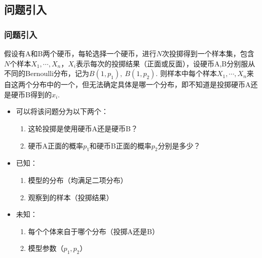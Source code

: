 \documentclass[UTF8]{ctexbeamer}
\numberwithin{equation}{section}  %
\begin{document}
\subsection{问题引入}
\begin{frame}
    \frametitle{问题引入}

    假设有A和B两个硬币，每轮选择一个硬币，进行$N$次投掷得到一个样本集，包含$N$个样本$X_1,\cdots, X_n$，$X_i$表示每次的投掷结果（正面或反面），设硬币A,B分别服从不同的Bernoulli分布，记为$B(1,p_1),\ B(1,p_2)$. 则样本中每个样本$X_1,\cdots,X_n$来自这两个分布中的一个，但无法确定具体是哪一个分布，即不知道是投掷硬币A还是硬币B得到的$x_i$. 
    \begin{itemize}
        \item<2-> 可以将该问题分为以下两个：

        \begin{enumerate}
            \item 这轮投掷是使用硬币A还是硬币B？
            \item 硬币A正面的概率$p_1$和硬币B正面的概率$p_2$分别是多少？
        \end{enumerate}
        \item<3->已知：
        \begin{enumerate}
            \item 模型的分布（均满足二项分布）
            \item 观察到的样本（投掷结果）
        \end{enumerate}
        \item<3-> 未知：
        \begin{enumerate}
            \item 每个个体来自于哪个分布（投掷A还是B）
            \item 模型参数（$p_1,p_2$）
        \end{enumerate}
    \end{itemize}
\end{frame}
\end{document}
